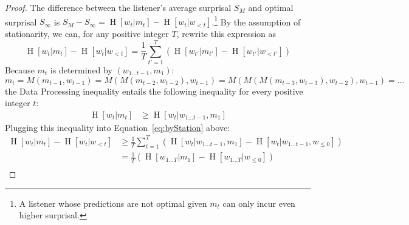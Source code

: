 \documentclass[11pt,letterpaper]{article}
\newcounter{theorem}
\newtheorem{lemma}[theorem]{Lemma}
\begin{document}
\begin{proof}
The difference between the listener's average surprisal $S_M$ and optimal surprisal $S_\infty$ is $S_M - S_\infty = \operatorname{H}[w_t | m_t] - \operatorname{H}[w_t | w_{<t}]$.\footnote{A listener whose predictions are not optimal given $m_t$ can only incur even higher surprisal.}
By the assumption of stationarity, we can, for any positive integer $T$, rewrite this expression as
\begin{equation}\label{eq:byStation}
\operatorname{H}[w_t | m_t] - \operatorname{H}[w_t | w_{<t}] =  \frac{1}{T} \sum_{t'=1}^{T} \left(\operatorname{H}[w_{t'} | m_{t'}] - \operatorname{H}[w_{t'} | w_{<t'}]\right) 
\end{equation}
%
%
%
Because $m_t$ is determined by $(w_{1 \dots t-1}, m_1)$:
\begin{equation}
	m_t = M(m_{t-1}, w_{t-1}) = M(M(m_{t-2}, w_{t-2}), w_{t-1}) = M(M(M(m_{t-3}, w_{t-3}), w_{t-2}), w_{t-1}) = \dots
\end{equation}
the Data Processing inequality entails the following inequality for every positive integer $t$:
\begin{align}\label{eq:plugged}
\operatorname{H}[w_t | m_t]& \geq \operatorname{H}[w_t|w_{1\dots t-1}, m_1]
\end{align}
Plugging this inequality into Equation~\ref{eq:byStation} above:
\begin{align}\label{eq:plugged}
\operatorname{H}[w_t | m_t] - \operatorname{H}[w_t | w_{<t}]& \geq \frac{1}{T} \sum_{t=1}^T ( \operatorname{H}[w_t|w_{1\dots t-1}, m_1] - \operatorname{H}[w_t | w_{1\dots t-1}, w_{\leq 0}]  )    \\
& = \frac{1}{T} \left(\operatorname{H}[w_{1\dots T} | m_1] - \operatorname{H}[w_{1\dots T} | w_{\leq 0}]\right)  \\

\end{align}
\end{proof}
\end{document}
